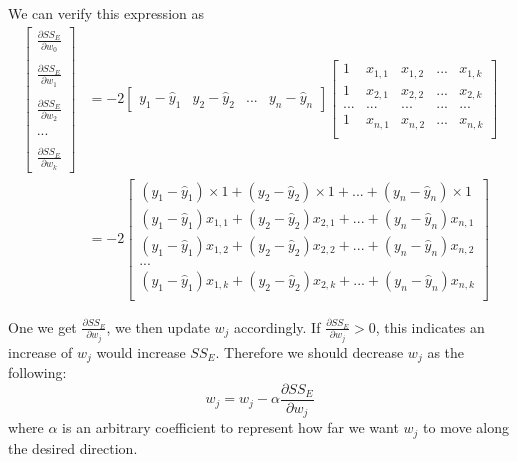 \documentclass[
	letterpaper
]{article}
\begin{document}
We can verify this expression as 
\begin{equation}
\begin{split}
\begin{bmatrix}\frac{\partial SS_E}{\partial w_0} \\ \\ \frac{\partial SS_E}{\partial w_1} \\ \\  \frac{\partial SS_E}{\partial w_2}  \\ \\ ... \\  \\ \frac{\partial SS_E}{\partial w_k}\end{bmatrix}
& = -2 \begin{bmatrix}y_1 - \hat y_1 & y_2 - \hat y_2 & ... & y_n - \hat y_n\end{bmatrix}
\begin{bmatrix}
1 & x_{1, 1} & x_{1, 2} & ... & x_{1, k} \\
1 & x_{2, 1} & x_{2, 2} & ... & x_{2, k} \\
... & ... & ... & ... & ... \\
1 & x_{n, 1} & x_{n, 2} & ... & x_{n, k} \\
\end{bmatrix}\\
& = -2 \begin{bmatrix}
(y_1 - \hat y_1)\times 1  + (y_2 - \hat y_2) \times 1 + ... + (y_n - \hat y_n) \times 1 \\
(y_1 - \hat y_1)  x_{1,1} + (y_2 - \hat y_2)  x_{2,1} + ... + (y_n - \hat y_n)  x_{n,1}\\
(y_1 - \hat y_1)  x_{1,2} + (y_2 - \hat y_2)  x_{2,2} + ... + (y_n - \hat y_n)  x_{n,2}\\
...\\
(y_1 - \hat y_1)  x_{1,k} + (y_2 - \hat y_2)  x_{2,k} + ... + (y_n - \hat y_n)  x_{n,k}\\
\end{bmatrix}
\end{split}
\end{equation}

One we get $\frac{\partial SS_E}{\partial w_j}$, we then update $w_j$ accordingly.
If $\frac{\partial SS_E}{\partial w_j} > 0$, this indicates an increase of $w_j$ would increase $SS_E$.
Therefore we should decrease $w_j$ as the following:
\begin{equation}
w_j = w_j - \alpha \frac{\partial SS_E}{\partial w_j} 
\end{equation}
where $\alpha$ is an arbitrary coefficient to represent how far we want $w_j$ to move along the desired direction.
 
\end{document}
